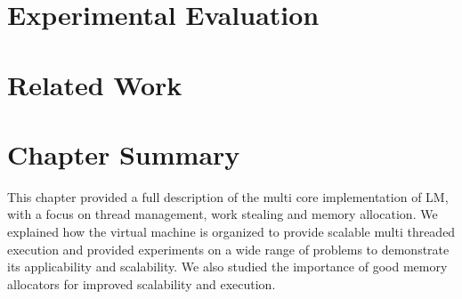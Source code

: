 \section{Experimental Evaluation}


\section{Related Work}


\section{Chapter Summary}

This chapter provided a full description of the multi core implementation of LM,
with a focus on thread management, work stealing and memory allocation.  We
explained how the virtual machine is organized to provide scalable multi
threaded execution and provided experiments on a wide range of problems to
demonstrate its applicability and scalability. We also studied the importance of
good memory allocators for improved scalability and execution.
